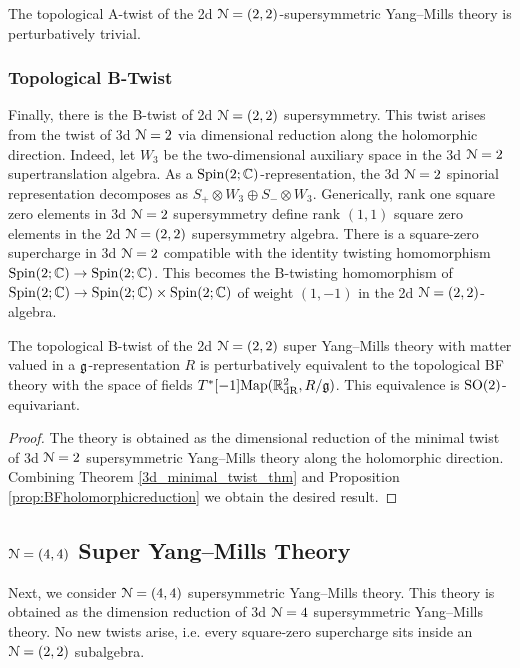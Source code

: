 \documentclass[10pt, oneside]{article}
\begin{document}
\begin{corollary}
The topological A-twist of the 2d $\mathcal N=(2,2)$-supersymmetric Yang--Mills theory is perturbatively trivial.
\end{corollary}

\subsubsection{Topological B-Twist} \label{sect:2d22Btwist}

Finally, there is the B-twist of 2d $\mathcal N=(2,2)$ supersymmetry.
This twist arises from the twist of 3d $\mathcal N=2$ via dimensional reduction along the holomorphic direction.
Indeed, let $W_3$ be the two-dimensional auxiliary space in the 3d $\mathcal{N}=2$ supertranslation algebra.  
As a $\mathrm{Spin}(2;\mathbb C)$-representation, the 3d $\mathcal N=2$ spinorial representation decomposes as $S_+ \otimes W_3 \oplus S_- \otimes W_3$.
Generically, rank one square zero elements in 3d $\mathcal{N}=2$ supersymmetry define rank $(1,1)$ square zero elements in the 2d $\mathcal{N}=(2,2)$ supersymmetry algebra.  
There is a square-zero supercharge in 3d $\mathcal{N}=2$ compatible with the identity twisting homomorphism $\mathrm{Spin}(2;\mathbb C) \to \mathrm{Spin}(2;\mathbb C)$.  This becomes the B-twisting homomorphism of $\mathrm{Spin}(2;\mathbb C) \to \mathrm{Spin}(2;\mathbb C) \times \mathrm{Spin}(2;\mathbb C)$ of weight $(1,-1)$ in the 2d $\mathcal{N}=(2,2)$-algebra.

\begin{theorem} \label{2d_2_B_twist_thm}
The topological B-twist of the 2d $\mathcal{N}=(2,2)$ super Yang--Mills theory with matter valued in a $\mathfrak g$-representation $R$ is perturbatively equivalent to the topological BF theory with the space of fields $T^*[-1]\mathrm{Map}(\mathbb R^2_{\mathrm{dR}}, R/\mathfrak{g})$.  This equivalence is $\mathrm{SO}(2)$-equivariant.
\end{theorem}

\begin{proof}
The theory is obtained as the dimensional reduction of the minimal twist of 3d $\mathcal{N}=2$ supersymmetric Yang--Mills theory along the holomorphic direction.
Combining Theorem \ref{3d_minimal_twist_thm} and Proposition \ref{prop:BFholomorphicreduction} we obtain the desired result.
\end{proof}

\subsection{\texorpdfstring{$\mathcal N=(4,4)$}{N=(4,4)} Super Yang--Mills Theory} \label{sect:2d(4,4)}
Next, we consider $\mathcal{N}=(4,4)$ supersymmetric Yang--Mills theory.
This theory is obtained as the dimension reduction of 3d $\mathcal{N}=4$ supersymmetric Yang--Mills theory.  
No new twists arise, i.e. every square-zero supercharge sits inside an $\mathcal{N}=(2,2)$ subalgebra.
\end{document}

